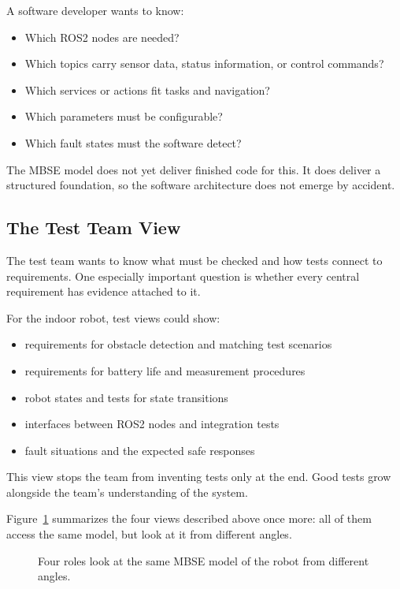 A software developer wants to know:

\begin{itemize}
    \item Which ROS2 nodes are needed?
    \item Which topics carry sensor data, status information, or control commands?
    \item Which services or actions fit tasks and navigation?
    \item Which parameters must be configurable?
    \item Which fault states must the software detect?
\end{itemize}

The MBSE model does not yet deliver finished code for this. It does deliver a structured foundation, so the software architecture does not emerge by accident.

\subsection{The Test Team View}
The test team wants to know what must be checked and how tests connect to requirements. One especially important question is whether every central requirement has evidence attached to it.

For the indoor robot, test views could show:

\begin{itemize}
    \item requirements for obstacle detection and matching test scenarios
    \item requirements for battery life and measurement procedures
    \item robot states and tests for state transitions
    \item interfaces between ROS2 nodes and integration tests
    \item fault situations and the expected safe responses
\end{itemize}

This view stops the team from inventing tests only at the end. Good tests grow alongside the team's understanding of the system.

Figure~\ref{fig:kap02-sichten-auf-modell} summarizes the four views described above once more: all of them access the same model, but look at it from different angles.

\begin{figure}[H]
  \centering
  \caption{Four roles look at the same MBSE model of the robot from different angles.}
  \label{fig:kap02-sichten-auf-modell}
\end{figure}

